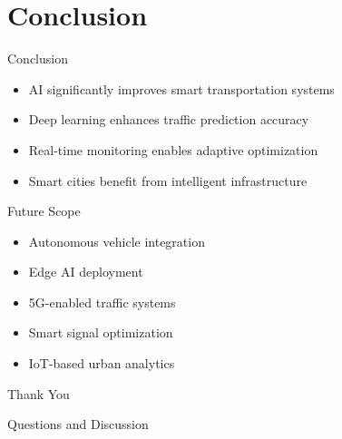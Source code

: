 \documentclass{beamer}
\begin{document}
	
	\section{Conclusion}
	
	
	\begin{frame}{Conclusion}
		
		\begin{itemize}
			
			\item AI significantly improves smart transportation systems
			
			\item Deep learning enhances traffic prediction accuracy
			
			\item Real-time monitoring enables adaptive optimization
			
			\item Smart cities benefit from intelligent infrastructure
			
		\end{itemize}
		
	\end{frame}
	
	
	\begin{frame}{Future Scope}
		
		\begin{itemize}
			
			\item Autonomous vehicle integration
			
			\item Edge AI deployment
			
			\item 5G-enabled traffic systems
			
			\item Smart signal optimization
			
			\item IoT-based urban analytics
			
		\end{itemize}
		
	\end{frame}
	
	
	\begin{frame}
		
		\centering
		
		\vspace{2cm}
		
		{\Huge Thank You}
		
		\vspace{1cm}
		
		Questions and Discussion
		
	\end{frame}
	
\end{document}
